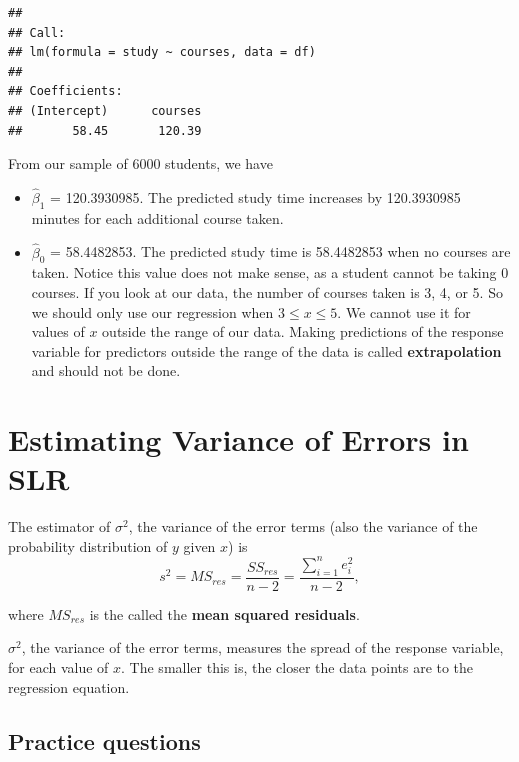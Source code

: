 \documentclass[
]{book}
\providecommand{\tightlist}{%
  \setlength{\itemsep}{0pt}\setlength{\parskip}{0pt}}
\begin{document}
\begin{verbatim}
## 
## Call:
## lm(formula = study ~ courses, data = df)
## 
## Coefficients:
## (Intercept)      courses  
##       58.45       120.39
\end{verbatim}

From our sample of 6000 students, we have

\begin{itemize}
\tightlist
\item
  \(\hat{\beta}_1\) = 120.3930985. The predicted study time increases by 120.3930985 minutes for each additional course taken.
\item
  \(\hat{\beta}_0\) = 58.4482853. The predicted study time is 58.4482853 when no courses are taken. Notice this value does not make sense, as a student cannot be taking 0 courses. If you look at our data, the number of courses taken is 3, 4, or 5. So we should only use our regression when \(3 \leq x \leq 5\). We cannot use it for values of \(x\) outside the range of our data. Making predictions of the response variable for predictors outside the range of the data is called \textbf{extrapolation} and should not be done.
\end{itemize}

\hypertarget{estimating-variance-of-errors-in-slr}{%
\section{Estimating Variance of Errors in SLR}\label{estimating-variance-of-errors-in-slr}}

The estimator of \(\sigma^2\), the variance of the error terms (also the variance of the probability distribution of \(y\) given \(x\)) is
\begin{equation} 
s^2 = MS_{res} = \frac{SS_{res}}{n-2} = \frac{\sum\limits_{i=1}^n e_i^2}{n-2},
\label{eq:variance}
\end{equation}

where \(MS_{res}\) is the called the \textbf{mean squared residuals}.

\(\sigma^2\), the variance of the error terms, measures the spread of the response variable, for each value of \(x\). The smaller this is, the closer the data points are to the regression equation.

\hypertarget{practice-questions-1}{%
\subsection{Practice questions}\label{practice-questions-1}}
\end{document}

